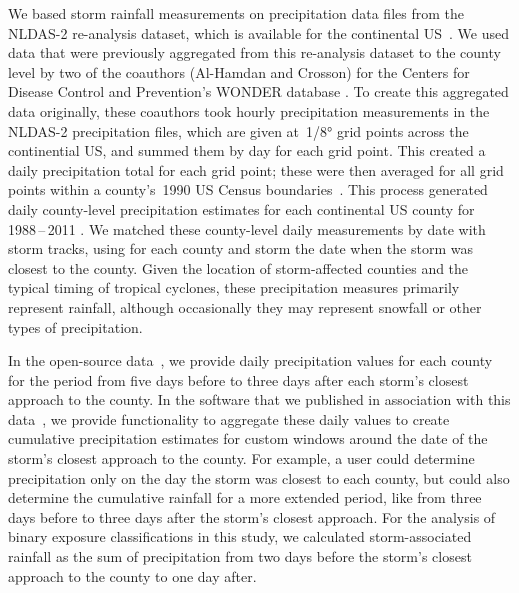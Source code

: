 We based storm rainfall measurements on precipitation data files from the
\ac{NLDAS-2} re-analysis dataset, which is available for the continental
\ac{US}~\parencite{rui2013nldas}. We used data that were previously aggregated
from this re-analysis dataset to the county level by two of the coauthors
(Al-Hamdan and Crosson) for the Centers for Disease Control and Prevention's
\ac{WONDER} database \parencite{cdcwonder, alhamdan2014environmental}. To
create this aggregated data originally, these coauthors took hourly
precipitation measurements in the \ac{NLDAS-2} precipitation files, which are
given at~1/8\si{\degree} grid points across the continential \ac{US}, and
summed them by day for each grid point.  This created a daily precipitation
total for each grid point; these were then averaged for all grid points within
a county's~1990 \ac{US} Census boundaries~\parencite{alhamdan2014environmental,
cdcwonder}. This process generated daily county-level precipitation estimates
for each continental \ac{US} county for 1988\,--\,2011 \parencite{cdcwonder}.
We matched these county-level daily measurements by date with storm tracks,
using for each county and storm the date when the storm was closest to the
county. Given the location of storm-affected counties and the typical timing of
tropical cyclones, these precipitation measures primarily represent rainfall,
although occasionally they may represent snowfall or other types of
precipitation.  

In the open-source data~\parencite{hurricaneexposuredata}, we provide daily
precipitation values for each county for the period from five days before to
three days after each storm's closest approach to the county.  In the software
that we published in association with this data~\parencite{hurricaneexposure},
we provide functionality to aggregate these daily values to create cumulative
precipitation estimates for custom windows around the date of the storm's
closest approach to the county. For example, a user could determine
precipitation only on the day the storm was closest to each county, but could
also determine the cumulative rainfall for a more extended period, like from
three days before to three days after the storm's closest approach. For the
analysis of binary exposure classifications in this study, we calculated
storm-associated rainfall as the sum of precipitation from two days before the
storm's closest approach to the county to one day after.  

